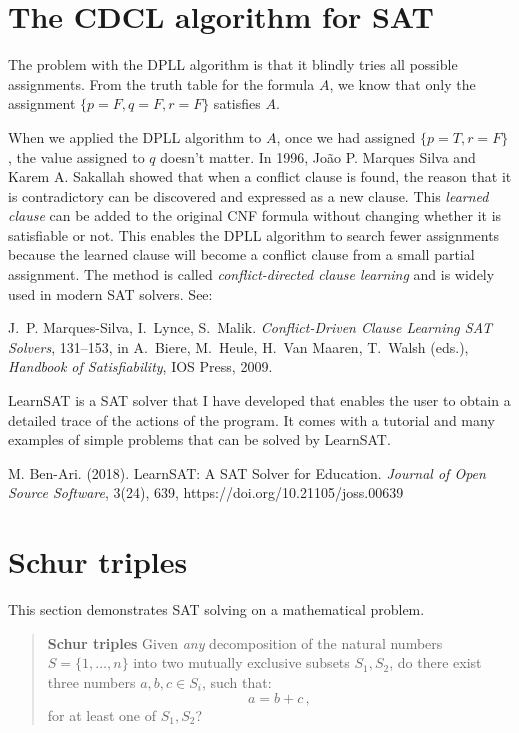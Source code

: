 \documentclass[11pt,a4paper]{article}
\begin{document}
\section{The CDCL algorithm for SAT}

The problem with the DPLL algorithm is that it blindly tries all possible assignments. From the truth table for the formula $A$, we know that only the assignment $\{p=F, q=F, r=F\}$ satisfies $A$.

When we applied the DPLL algorithm to $A$, once we had assigned $\{p=T,r=F\}$, the value assigned to $q$ doesn't matter. In 1996, Jo\~{a}o P. Marques Silva and Karem A. Sakallah showed that when a conflict clause is found, the reason that it is contradictory can be discovered and expressed as a new clause. This \emph{learned clause} can be added to the original CNF formula without changing whether it is satisfiable or not. This enables the DPLL algorithm to search fewer assignments because the learned clause will become a conflict clause from a small partial assignment. The method is called \emph{conflict-directed clause learning} and is widely used in modern SAT solvers. See:

J.~P. Marques-Silva, I.~Lynce, S.~Malik. {\em Conflict-Driven Clause Learning SAT Solvers}, 131--153, in A.~Biere, M.~Heule, H.~Van Maaren, T.~Walsh (eds.), {\em Handbook of Satisfiability}, IOS Press, 2009.

LearnSAT is a SAT solver that I have developed that enables the user to obtain a detailed trace of the actions of the program. It comes with a tutorial and many examples of simple problems that can be solved by LearnSAT.

M. Ben-Ari. (2018). LearnSAT: A SAT Solver for Education. \textit{Journal of Open Source Software}, 3(24), 639, https://doi.org/10.21105/joss.00639

\section{Schur triples}

This section demonstrates SAT solving on a mathematical problem.

\begin{quote}
\textbf{Schur triples} Given \textit{any} decomposition of the natural numbers $S=\{1,\ldots,n\}$ into two mutually exclusive subsets $S_1,S_2$, do there exist three numbers $a,b,c\in S_i$, such that:
\[
a=b+c\,,
\]
for at least one of $S_1,S_2$?
\end{quote}
\end{document}
